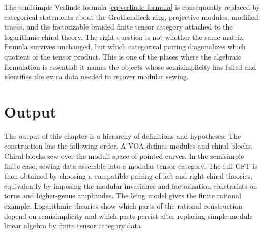 The semisimple Verlinde formula
\eqref{eq:verlinde-formula} is consequently replaced by categorical
statements about the Grothendieck ring, projective modules, modified traces,
and the factorizable braided finite tensor category attached to the
logarithmic chiral theory.  The right question is not whether the same matrix
formula survives unchanged, but which categorical pairing diagonalizes which
quotient of the tensor product.  This is one of the places where the
algebraic formulation is essential: it names the objects whose semisimplicity
has failed and identifies the extra data needed to recover modular sewing.

\section{Output}

The output of this chapter is a hierarchy of definitions and hypotheses:
The construction has the following order.  A VOA defines modules and chiral
blocks.  Chiral blocks sew over the moduli space of pointed curves.  In the
semisimple finite case, sewing data assemble into a modular tensor category.
The full CFT is then obtained by choosing a compatible pairing of left and
right chiral theories, equivalently by imposing the modular-invariance and
factorization constraints on torus and higher-genus amplitudes.
The Ising model gives the finite rational example.  Logarithmic theories show
which parts of the rational construction depend on semisimplicity and which
parts persist after replacing simple-module linear algebra by finite tensor
category data.
